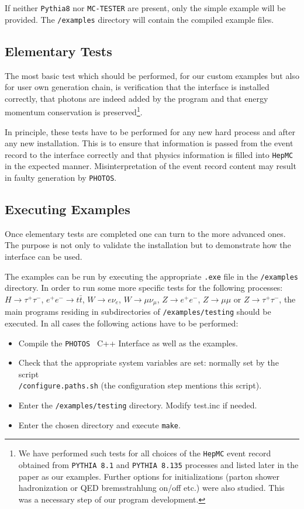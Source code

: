 \documentclass[]{Photos_interface_design}
\begin{document}
If neither {\tt Pythia8} nor {\tt MC-TESTER} are present, only the simple example will be provided. The {\tt /examples} directory will contain the compiled example files.

\subsection{Elementary Tests}
\label{sect:elem}

The most basic test which should be performed, for our custom examples but also for  user own generation chain, 
 is verification that the interface is installed correctly, that 
photons are indeed added by the program and that energy momentum conservation is preserved\footnote{
We have  performed such  tests for all choices of the {\tt HepMC} event record obtained 
from  {\tt PYTHIA 8.1} and {\tt PYTHIA 8.135} processes and 
listed later in the paper as our examples. Further  options for initializations 
(parton shower hadronization or QED bremsstrahlung on/off etc.) were also studied.
This was a necessary step of our program development.}.

In principle, these tests have to be performed for any new hard 
process and after any new installation. This is to ensure that 
information is passed from the event record to the interface 
correctly and that physics information is filled into {\tt HepMC} 
in the expected manner. Misinterpretation of the event record content may result in 
faulty generation by {\tt PHOTOS}.


\subsection{Executing Examples}

Once elementary tests are completed one can turn to the more advanced ones.
The purpose is not only to validate the installation but to demonstrate how the
interface can be used.

The examples can be run by executing the appropriate {\tt .exe} file in the {\tt /examples} directory.
In order to run some more specific tests for the following processes:
$H \rightarrow \tau^+ \tau^-$, $ e^+ e^- \rightarrow t \bar t$,
$W \rightarrow e \nu_e$, $W \rightarrow \mu \nu_\mu$,
$Z \rightarrow e^+ e^-$, $Z \rightarrow \mu \mu$ or $Z \rightarrow \tau^+ \tau^-$,
the main programs residing in subdirectories of {\tt /examples/testing} should be executed.
In all cases the following actions have to be performed:

\begin{itemize}
  \item Compile the {\tt PHOTOS } C++ Interface as well as the examples. 
 \item  Check that the appropriate system variables are set: normally set by the script \\
{\tt /configure.paths.sh} (the configuration step mentions this script).
  \item Enter the {\tt /examples/testing} directory. Modify test.inc if needed.
  \item Enter the chosen directory and execute {\tt make}.
\end{itemize}
\end{document}
